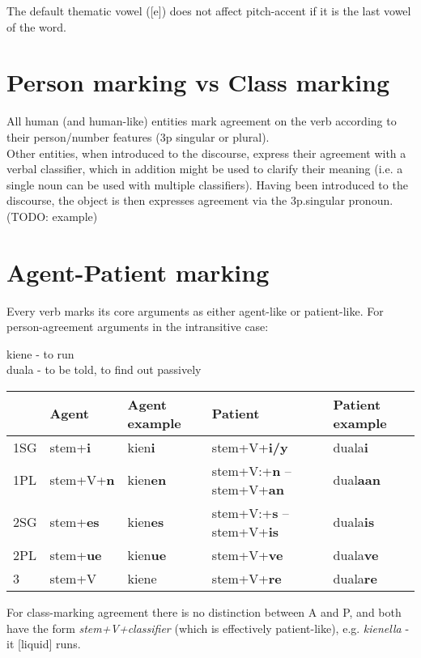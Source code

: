 \documentclass[8pt]{book}
\begin{document}
The default thematic vowel ([e]) does not affect pitch-accent if it is the last vowel of the word.


\section{Person marking vs Class marking}
All human (and human-like) entities mark agreement on the verb according to their person/number features (3p singular or plural). \\ 
Other entities, when introduced to the discourse, express their agreement with a verbal classifier, which in addition might be used to clarify their meaning (i.e. a single noun can be used with multiple classifiers). Having been introduced to the discourse, the object is then expresses agreement via the 3p.singular pronoun. (TODO: example)

\section{Agent-Patient marking}
Every verb marks its core arguments as either agent-like or patient-like. For person-agreement arguments in the intransitive case:

kiene - to run \\
duala - to be told, to find out passively

\begin{center}
\begin{tabular}{l|l|l|l|l}
\hline
  & Agent & Agent example & Patient & Patient example \\ \hline
1SG & stem+\textbf{i} & kien\textbf{i} & stem+V+\textbf{i/y} & duala\textbf{i} \\ \hline
1PL & stem+V+\textbf{n} & kien\textbf{en} &  stem+V:+\textbf{n} -- stem+V+\textbf{an} & dual\textbf{aan} \\ \hline
2SG & stem+\textbf{es}  & kien\textbf{es} & stem+V:+\textbf{s} -- stem+V+\textbf{is} & duala\textbf{is} \\ \hline
2PL & stem+\textbf{ue} & kien\textbf{ue} & stem+V+\textbf{ve} & duala\textbf{ve} \\ \hline
3 & stem+V & kiene & stem+V+\textbf{re} & duala\textbf{re} \\\hline

\end{tabular}
\end{center}

For class-marking agreement there is no distinction between A and P, and both have the form \textit{stem+V+classifier} (which is effectively patient-like), e.g. \textit{kienella} - it [liquid] runs. \\
\end{document}

